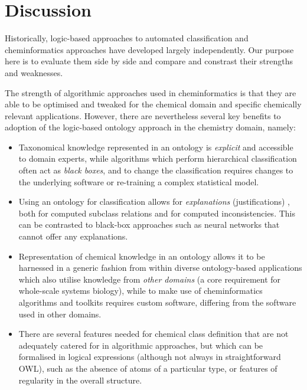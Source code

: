 \documentclass[10pt]{bmc_article}
\newenvironment{bmcformat}{\baselineskip20pt\sloppy\setboolean{publ}{false}}{\baselineskip20pt\sloppy}
\begin{document}
\begin{bmcformat}
\section*{Discussion}



Historically, logic-based approaches to automated classification and cheminformatics approaches have developed largely independently. Our purpose here is to evaluate them side by side and compare and constrast their strengths and weaknesses. 

The strength of algorithmic approaches used in cheminformatics is that they are able to be optimised and tweaked for the chemical domain and specific chemically relevant applications. However, there are nevertheless several key benefits to adoption of the logic-based ontology approach in the chemistry domain, namely:
\begin{itemize}
	\item Taxonomical knowledge represented in an ontology is \textit{explicit} and accessible to domain experts, while algorithms which perform hierarchical classification often act as \textit{black boxes}, and to change the classification requires changes to the underlying software or re-training a complex statistical model.
	\item Using an ontology for classification allows for \textit{explanations} (justifications) \cite{horridgeentail09}, both for computed subclass relations and for computed inconsistencies. This can be contrasted to black-box approaches such as neural networks that cannot offer any explanations. 
	\item Representation of chemical knowledge in an ontology allows it to be harnessed in a generic fashion from within diverse ontology-based applications which also utilise knowledge from \textit{other domains} (a core requirement for whole-scale systems biology), while to make use of cheminformatics algorithms and toolkits requires custom software, differing from the software used in other domains.
	\item There are several features needed for chemical class definition that are not adequately catered for in algorithmic approaches, but which can be formalised in logical expressions (although not always in straightforward OWL), such as the absence of atoms of a particular type, or features of regularity in the overall structure. 
\end{itemize}


\end{bmcformat}
\end{document}
